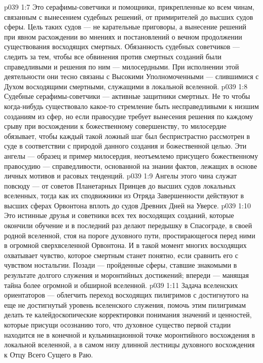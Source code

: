 \vs p039 1:7 \pc {}\bibnobreakspace {} Это серафимы\hyp{}советчики и помощники, прикрепленные ко всем чинам, связанным с вынесением судебных решений, от примирителей до высших судов сферы. Цель таких судов --- не карательные приговоры, а вынесение решений при явном расхождении во мнениях и постановлений о вечном продолжении существования восходящих смертных. Обязанность судебных советчиков --- следить за тем, чтобы все обвинения против смертных созданий были справедливыми и решения по ним --- милосердными. При исполнении этой деятельности они тесно связаны с Высокими Уполномоченными --- слившимися с Духом восходящими смертными, служащими в локальной вселенной.
\vs p039 1:8 Судебные серафимы\hyp{}советчики --- активные защитники смертных. Не то чтобы когда\hyp{}нибудь существовало какое\hyp{}то стремление быть несправедливыми к низшим созданиям из сфер, но если правосудие требует вынесения решения по каждому срыву при восхождении к божественному совершенству, то милосердие обязывает, чтобы каждый такой ложный шаг был беспристрастно рассмотрен в суде в соответствии с природой данного создания и божественной целью. Эти ангелы --- образец и пример милосердия, неотъемлемо присущего божественному правосудию --- справедливости, основанной на знании фактов, лежащих в основе личных мотивов и расовых тенденций.
\vs p039 1:9 Ангелы этого чина служат повсюду --- от советов Планетарных Принцев до высших судов локальных вселенных, тогда как их сподвижники из Отряда Завершенности действуют в высших сферах Орвонтона вплоть до судов Древних Дней на Уверсе.
\vs p039 1:10 \pc {}\bibnobreakspace {} Это истинные друзья и советники всех тех восходящих созданий, которые окончили обучение и в последний раз делают передышку в Спасограде, в своей родной вселенной, стоя на пороге духовного пути, простирающегося перед ними в огромной сверхвселенной Орвонтона. И в такой момент многих восходящих охватывает чувство, которое смертным станет понятно, если сравнить его с чувством ностальгии. Позади --- пройденные сферы, ставшие знакомыми в результате долгого служения и моронтийных достижений; впереди --- манящая тайна более огромной и обширной вселенной.
\vs p039 1:11 Задача вселенских ориентаторов --- облегчить переход восходящих пилигримов с достигнутого на еще не достигнутый уровень вселенского служения, помочь этим пилигримам делать те калейдоскопические корректировки понимания значений и ценностей, которые присущи осознанию того, что духовное существо первой стадии находится не в конечной и кульминационной точке моронтийного восхождения в локальной вселенной, а в самом низу длинной лестницы духовного восхождения к Отцу Всего Сущего в Раю.
